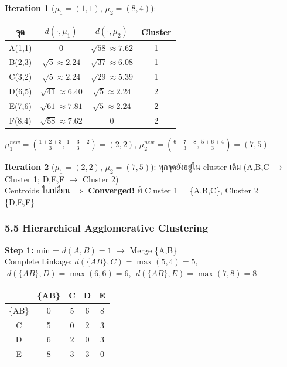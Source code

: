 \documentclass[a4paper,12pt]{article}
\begin{document}
\textbf{Iteration 1} ($\mu_1=(1,1)$, $\mu_2=(8,4)$):
\begin{center}
\small
\begin{tabular}{|c|c|c|c|}
    \hline
    \rowcolor{cyan!15}
    จุด & $d(\cdot, \mu_1)$ & $d(\cdot, \mu_2)$ & Cluster \\
    \hline
    A(1,1) & 0 & $\sqrt{58}\approx7.62$ & 1 \\
    B(2,3) & $\sqrt{5}\approx2.24$ & $\sqrt{37}\approx6.08$ & 1 \\
    C(3,2) & $\sqrt{5}\approx2.24$ & $\sqrt{29}\approx5.39$ & 1 \\
    D(6,5) & $\sqrt{41}\approx6.40$ & $\sqrt{5}\approx2.24$ & 2 \\
    E(7,6) & $\sqrt{61}\approx7.81$ & $\sqrt{5}\approx2.24$ & 2 \\
    F(8,4) & $\sqrt{58}\approx7.62$ & 0 & 2 \\
    \hline
\end{tabular}
\end{center}
$\mu_1^{new} = \left(\frac{1+2+3}{3}, \frac{1+3+2}{3}\right) = (2, 2)$, \quad $\mu_2^{new} = \left(\frac{6+7+8}{3}, \frac{5+6+4}{3}\right) = (7, 5)$

\textbf{Iteration 2} ($\mu_1=(2,2)$, $\mu_2=(7,5)$): ทุกจุดยังอยู่ใน cluster เดิม (A,B,C $\to$ Cluster 1; D,E,F $\to$ Cluster 2)\\
Centroids ไม่เปลี่ยน $\Rightarrow$ \textbf{Converged!} ที่ Cluster 1 = \{A,B,C\}, Cluster 2 = \{D,E,F\}

\subsubsection*{5.5 Hierarchical Agglomerative Clustering}

\textbf{Step 1:} min = $d(A,B) = 1$ $\to$ Merge \{A,B\}\\
Complete Linkage: $d(\{AB\},C)=\max(5,4)=5$, $\;d(\{AB\},D)=\max(6,6)=6$, $\;d(\{AB\},E)=\max(7,8)=8$

\begin{center}
\small
\begin{tabular}{|c|cccc|}
    \hline \rowcolor{cyan!15}
    & \{AB\} & C & D & E \\ \hline
    \{AB\} & 0 & 5 & 6 & 8 \\
    C & 5 & 0 & 2 & 3 \\
    D & 6 & 2 & 0 & 3 \\
    E & 8 & 3 & 3 & 0 \\ \hline
\end{tabular}
\end{center}
\end{document}
